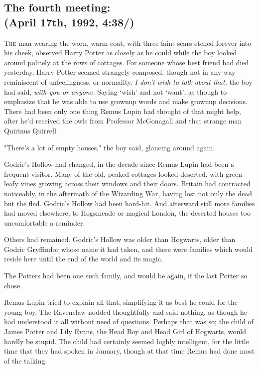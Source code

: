 
\subsection{The fourth meeting:\\
(April 17th, 1992, 4:38\PM/)}

\lettrine{T}{he} man wearing the worn, warm coat, with three faint scars etched forever into
his cheek, observed Harry Potter as closely as he could while the boy looked
around politely at the rows of cottages. For someone whose best friend had died
yesterday, Harry Potter seemed strangely composed, though not in any way
reminiscent of unfeelingness, or normality. \emph{I don't wish to talk about
that,} the boy had said, \emph{with you or anyone.} Saying `wish' and not
`want', as though to emphasize that he was able to use grownup words and make
grownup decisions. There had been only one thing Remus Lupin had thought of
that might help, after he'd received the owls from Professor McGonagall and
that strange man Quirinus Quirrell.

"There's a lot of empty houses," the boy said, glancing around again.

Godric's Hollow had changed, in the decade since Remus Lupin had been a
frequent visitor. Many of the old, peaked cottages looked deserted, with green
leafy vines growing across their windows and their doors. Britain had
contracted noticeably, in the aftermath of the Wizarding War, having lost not
only the dead but the fled. Godric's Hollow had been hard-hit. And afterward
still more families had moved elsewhere, to Hogsmeade or magical London, the
deserted houses too uncomfortable a reminder.

Others had remained. Godric's Hollow was older than Hogwarts, older than Godric
Gryffindor whose name it had taken, and there were families which would reside
here until the end of the world and its magic.

The Potters had been one such family, and would be again, if the last Potter so
chose.

Remus Lupin tried to explain all that, simplifying it as best he could for the
young boy. The Ravenclaw nodded thoughtfully and said nothing, as though he had
understood it all without need of questions. Perhaps that was so; the child of
James Potter and Lily Evans, the Head Boy and Head Girl of Hogwarts, would
hardly be stupid. The child had certainly seemed highly intelligent, for the
little time that they had spoken in January, though at that time Remus had done
most of the talking.

